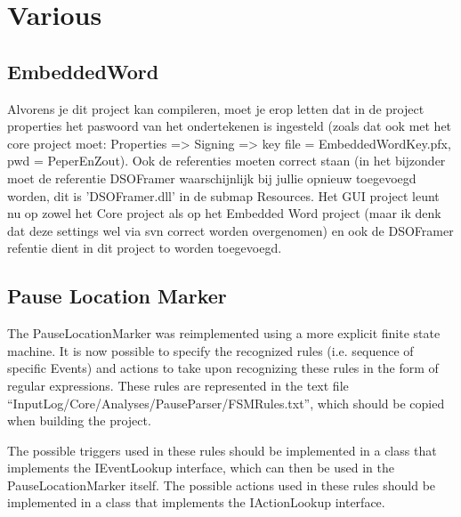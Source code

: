 \documentclass[a4paper,11pt]{report}
\begin{document}
\chapter{Various}
\section{EmbeddedWord}
Alvorens je dit project kan compileren, moet je erop letten dat in de project properties het paswoord van het ondertekenen is ingesteld (zoals dat ook met het core project moet: Properties => Signing => key file = EmbeddedWordKey.pfx, pwd = PeperEnZout). Ook de referenties moeten correct staan (in het bijzonder moet de referentie DSOFramer waarschijnlijk bij jullie opnieuw toegevoegd worden, dit is 'DSOFramer.dll' in de submap Resources. Het GUI project leunt nu op zowel het Core project als op het Embedded Word project (maar ik denk dat deze settings wel via svn correct worden overgenomen) en ook de DSOFramer refentie dient in dit project to worden toegevoegd.

\section{Pause Location Marker}

	The PauseLocationMarker was reimplemented using a more explicit finite state machine.
	It is now possible to specify the recognized rules (i.e. sequence of specific Events) and actions to take upon recognizing these rules in the form of regular expressions.
	These rules are represented in the text file ``InputLog/Core/Analyses/PauseParser/FSMRules.txt'', which should be copied when building the project.
	
	
	The possible triggers used in these rules should be implemented in a class that implements the IEventLookup interface, which can then be used in the PauseLocationMarker itself.
	The possible actions used in these rules should be implemented in a class that implements the IActionLookup interface.
\end{document}
